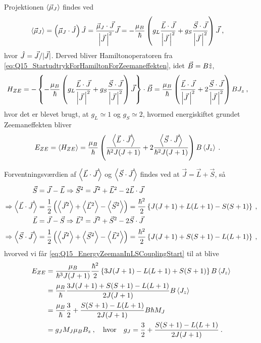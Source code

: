 Projektionen $\Braket{\Vec{\mu}_J}$ findes ved
\begin{align}
    \Braket{\Vec{\mu}_J} &= \left(\Vec{\mu}_J \cdot \Hat{J}\right) \Hat{J} = \frac{\Vec{\mu}_J \cdot \Vec{J}}{\abs{\Vec{J} \,}^2} \Vec{J} = - \frac{\mu_B}{\hbar} \left( g_L \frac{\Vec{L} \cdot \Vec{J}}{\abs{\Vec{J} \,}^2} + g_S \frac{\Vec{S} \cdot \Vec{J}}{\abs{\Vec{J} \,}^2} \right) \Vec{J} \: ,
\end{align}
hvor $\Hat{J} = \Vec{J}/|\Vec{J}|$. Derved bliver Hamiltonoperatoren fra \cref{eq:Q15_StartudtrykForHamiltonForZeemaneffekten}, idet $\Vec{B} = B\Hat{z}$,
\begin{align}
    H_{ZE} &= -\left\{- \frac{\mu_B}{\hbar} \left( g_L \frac{\Vec{L} \cdot \Vec{J}}{\abs{\Vec{J} \,}^2} + g_S \frac{\Vec{S} \cdot \Vec{J}}{\abs{\Vec{J} \,}^2} \right) \Vec{J} \right\} \cdot \Vec{B} = \frac{\mu_B}{\hbar} \left( \frac{\Vec{L} \cdot \Vec{J}}{\abs{\Vec{J} \,}^2} + 2\frac{\Vec{S} \cdot \Vec{J}}{\abs{\Vec{J} \,}^2} \right) B J_z \: ,
\end{align}
hvor det er blevet brugt, at $g_L \simeq 1$ og $g_S \simeq 2$, hvormed energiskiftet grundet Zeemaneffekten bliver
\begin{align} \label{eq:Q15_EnergyZeemanInLSCouplingStart}
    E_{ZE} &= \Braket{H_{ZE}} = \frac{\mu_B}{\hbar} \left( \frac{\Braket{\Vec{L} \cdot \Vec{J}}}{\hbar^2 J(J+1)} + 2 \frac{\Braket{\Vec{S} \cdot \Vec{J}}}{\hbar^2 J(J+1)} \right) B \Braket{J_z} \: .
\end{align}

Forventningsværdien af $\Braket{\Vec{L} \cdot \Vec{J}}$ og $\Braket{\Vec{S} \cdot \Vec{J}}$ findes ved at $\Vec{J} = \Vec{L} + \Vec{S}$, så
\begin{align}
    \Vec{S} &= \Vec{J} - \Vec{L} \Rightarrow \Vec{S}^2 = \Vec{J}^2 + \Vec{L}^2 - 2\Vec{L} \cdot \Vec{J} \nonumber\\
    \Rightarrow \Braket{\Vec{L} \cdot \Vec{J}} &= \frac{1}{2} \left(\Braket{\Vec{J}^2} + \Braket{\Vec{L}^2} - \Braket{\Vec{S}^2}\right) = \frac{\hbar^2}{2} \left\{J(J+1) + L(L+1) - S(S+1)\right\} \: , \\
    \Vec{L} &= \Vec{J} - \Vec{S} \Rightarrow \Vec{L}^2 = \Vec{J}^2 + \Vec{S}^2 - 2\Vec{S} \cdot \Vec{J} \nonumber\\
    \Rightarrow \Braket{\Vec{S} \cdot \Vec{J}} &= \frac{1}{2} \left(\Braket{\Vec{J}^2} + \Braket{\Vec{S}^2} - \Braket{\Vec{L}^2}\right) = \frac{\hbar^2}{2} \left\{J(J+1) + S(S+1) - L(L+1)\right\} \: ,
\end{align}
hvorved vi får \cref{eq:Q15_EnergyZeemanInLSCouplingStart} til at blive
\begin{align}
    E_{ZE} &= \frac{\mu_B}{\hbar^3 J(J+1)} \frac{\hbar^2}{2}\left\{3J(J+1) - L(L+1) + S(S+1)\right\} B \Braket{J_z} \nonumber\\
    &= \frac{\mu_B}{\hbar} \frac{3J(J+1) + S(S+1) - L(L+1)}{2J(J+1)} B \Braket{J_z} \nonumber\\
    &= \frac{\mu_B}{\hbar} \frac{3}{2} + \frac{S(S+1) - L(L+1)}{2J(J+1)} B \hbar M_J \nonumber\\
    &= g_J M_J \mu_B B_z \: , \quad \text{hvor} \quad g_J = \frac{3}{2} + \frac{S(S+1) - L(L+1)}{2J(J+1)} \: .
\end{align}


